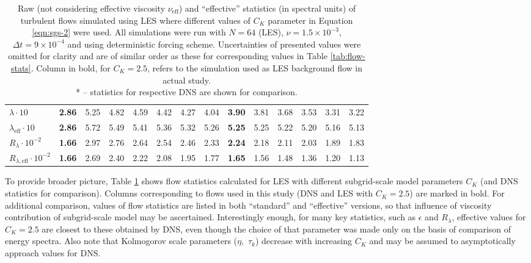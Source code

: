 \documentclass{pracamgren}
\begin{document}
\begin{table}[ht]
\begin{tabular}{llllllllllllll}
$\lambda \cdot 10$ & \textbf{2.86} & 5.25 & 4.82 & 4.59 & 4.42 & 4.27 & 4.04 & \textbf{3.90} & 3.81 & 3.68 & 3.53 & 3.31 & 3.22 \\
$\lambda_{\text{eff}} \cdot 10$ & \textbf{2.86} & 5.72 & 5.49 & 5.41 & 5.36 & 5.32 & 5.26 & \textbf{5.25} & 5.25 & 5.22 & 5.20 & 5.16 & 5.13 \\
$R_{\lambda} \cdot 10^{-2}$ & \textbf{1.66} & 2.97 & 2.76 & 2.64 & 2.54 & 2.46 & 2.33 & \textbf{2.24} & 2.18 & 2.11 & 2.03 & 1.89 & 1.83 \\
$R_{\lambda, \text{eff}} \cdot 10^{-2}$ & \textbf{1.66} & 2.69 & 2.40 & 2.22 & 2.08 & 1.95 & 1.77 & \textbf{1.65} & 1.56 & 1.48 & 1.36 & 1.20 & 1.13 \\ \hline
\end{tabular}
\caption{Raw (not considering effective viscosity $\nu_{\text{eff}}$) and ``effective'' statistics (in spectral units) of turbulent flows simulated using LES where different values of $C_K$ parameter in Equation \ref{eqn:sgs-2} were used. 
All simulations were run with $N=64$ (LES), $\nu = 1.5 \times 10^{-3}$, $\Delta t = 9 \times 10^{-4}$ and using deterministic forcing scheme.
Uncertainties of presented values were omitted for clarity and are of similar order as these for corresponding values in Table \ref{tab:flow-stats}.
Column in bold, for $C_K=2.5$, refers to the simulation used as LES background flow in actual study. \\
* -- statistics for respective DNS are shown for comparison.
}
\label{tab:sgs-stats}
\end{table}

To provide broader picture, Table \ref{tab:sgs-stats} shows flow statistics calculated for LES with different subgrid-scale model parameters $C_K$ (and DNS statistics for comparison).
Columns corresponding to flows used in this study (DNS and LES with $C_K=2.5$) are marked in bold.
For additional comparison, values of flow statistics are listed in both ``standard'' and ``effective'' versions, so that influence of viscosity contribution of subgrid-scale model may be ascertained.
Interestingly enough, for many key statistics, such as $\epsilon$ and $R_{\lambda}$, effective values for $C_K=2.5$ are closest to these obtained by DNS, even though the choice of that parameter was made only on the basis of comparison of energy spectra.
Also note that Kolmogorov scale parameters ($\eta$,~$\tau_k$) decrease with increasing $C_K$ and may be assumed to asymptotically approach values for DNS.
\end{document}
